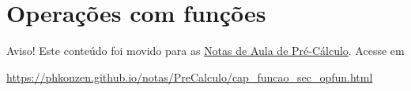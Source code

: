 \section{Operações com funções}\label{cap_funcao_sec_opfun}

\begin{center}
  Aviso! Este conteúdo foi movido para as \href{https://phkonzen.github.io/notas/PreCalculo/main.html}{Notas de Aula de Pré-Cálculo}. Acesse em

  \url{https://phkonzen.github.io/notas/PreCalculo/cap_funcao_sec_opfun.html}
\end{center}







